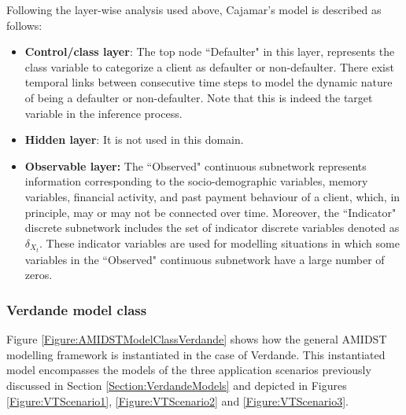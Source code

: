 Following the layer-wise analysis used above, Cajamar's model is described as follows:
\begin{itemize}

\item \textbf{Control/class layer}: The top node ``Defaulter" in this layer, represents the class variable to categorize a client as defaulter or non-defaulter. There exist temporal links between consecutive time steps to model the dynamic nature of being a defaulter or non-defaulter. Note that this is indeed the target variable in the inference process.

\item \textbf{Hidden layer}: It is not used in this domain.

\item \textbf{Observable layer:} The ``Observed" continuous subnetwork represents information corresponding to the socio-demographic variables, memory variables, financial activity, and past payment behaviour of a client, which, in principle, may or may not be connected over time. Moreover, the ``Indicator" discrete subnetwork includes the set of indicator discrete variables denoted as $\delta_{X_t}$. These indicator variables are used for modelling situations in which some variables in the ``Observed" continuous subnetwork have a large number of zeros.

\end{itemize}


\subsubsection{Verdande model class}\label{verdandeAMIDSTModels}

Figure \ref{Figure:AMIDSTModelClassVerdande} shows how the general AMIDST modelling framework is instantiated in the case of Verdande. This instantiated model encompasses the models of the three application scenarios previously discussed in Section \ref{Section:VerdandeModels} and depicted in Figures \ref{Figure:VTScenario1}, \ref{Figure:VTScenario2} and \ref{Figure:VTScenario3}.

